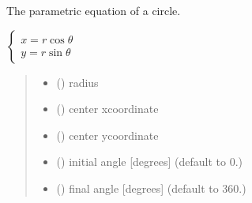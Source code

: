 \documentclass[letterpaper,10pt,english]{sphinxmanual}
\begin{document}

\begin{fulllineitems}
\label{\detokenize{01_utils:skinoptics.utils.circle}}
\pysigstartsignatures
{}
\pysigstopsignatures
\sphinxAtStartPar
The parametric equation of a circle.

\sphinxAtStartPar
\(\left \{ \begin{matrix}
x = r \cos \theta \\
y = r \sin \theta
\end{matrix} \right.\)
\begin{quote}\begin{description}
\begin{itemize}
\item {} 
\sphinxAtStartPar
{} () \textendash{} radius

\item {} 
\sphinxAtStartPar
{} () \textendash{} center x\sphinxhyphen{}coordinate

\item {} 
\sphinxAtStartPar
{} () \textendash{} center y\sphinxhyphen{}coordinate

\item {} 
\sphinxAtStartPar
{} () \textendash{} initial angle {[}degrees{]} (default to 0.)

\item {} 
\sphinxAtStartPar
{} () \textendash{} final angle {[}degrees{]} (default to 360.)


\end{itemize}
\end{description}
\end{quote}
\end{fulllineitems}
\end{document}
